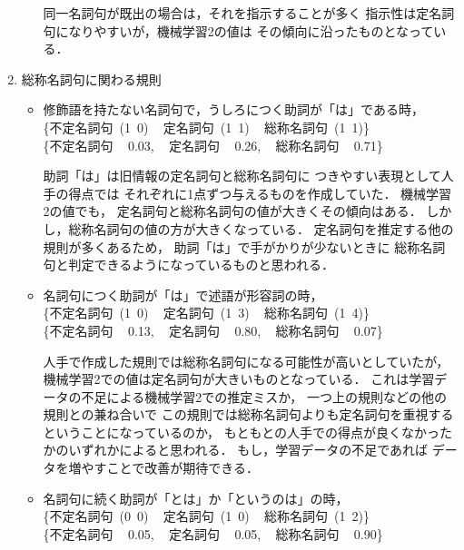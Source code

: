 \begin{enumerate}
\begin{itemize}
    同一名詞句が既出の場合は，それを指示することが多く
    指示性は定名詞句になりやすいが，機械学習2の値は
    その傾向に沿ったものとなっている．

  \end{itemize}

\item 
  総称名詞句に関わる規則
  \begin{itemize}
  \item 
    修飾語を持たない名詞句で，うしろにつく助詞が「は」である時，\\
    \mbox{\{\mbox{不定名詞句} (1 0) \,
      \mbox{定名詞句}   (1 1) \,
      \mbox{総称名詞句} (1 1)\}}\\
    \mbox{\{\mbox{不定名詞句}  \, 0.03, \,
      \mbox{定名詞句}    \, 0.26, \,
      \mbox{総称名詞句}  \, 0.71\}}

    助詞「は」は旧情報の定名詞句と総称名詞句に
    つきやすい表現として人手の得点では
    それぞれに1点ずつ与えるものを作成していた．
    機械学習2の値でも，
    定名詞句と総称名詞句の値が大きくその傾向はある．
    しかし，総称名詞句の値の方が大きくなっている．
    定名詞句を推定する他の規則が多くあるため，
    助詞「は」で手がかりが少ないときに
    総称名詞句と判定できるようになっているものと思われる．

  \item 
    名詞句につく助詞が「は」で述語が形容詞の時，\\
    \mbox{\{\mbox{不定名詞句}  (1  0) \,
      \mbox{定名詞句}    (1  3) \,
      \mbox{総称名詞句}  (1  4)\}}\\
    \mbox{\{\mbox{不定名詞句}  \, 0.13, \,
      \mbox{定名詞句}  \,  0.80, \,
      \mbox{総称名詞句} \, 0.07\}}

    人手で作成した規則では総称名詞句になる可能性が高いとしていたが，
    機械学習2での値は定名詞句が大きいものとなっている．
    これは学習データの不足による機械学習2での推定ミスか，
    一つ上の規則などの他の規則との兼ね合いで
    この規則では総称名詞句よりも定名詞句を重視するということになっているのか，
    もともとの人手での得点が良くなかったかのいずれかによると思われる．
    もし，学習データの不足であれば
    データを増やすことで改善が期待できる．

  \item 
    名詞句に続く助詞が「とは」か「というのは」の時，\\
    \mbox{\{\mbox{不定名詞句} (0 0) \,
      \mbox{定名詞句}   (1 0) \,
      \mbox{総称名詞句} (1 2)\}}\\
    \mbox{\{\mbox{不定名詞句}  \, 0.05, \,
      \mbox{定名詞句}    \, 0.05, \,
      \mbox{総称名詞句}  \, 0.90\}}


\end{itemize}
\end{enumerate}
